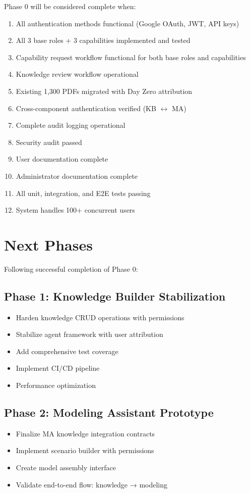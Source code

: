 \documentclass[12pt,a4paper]{article}
\begin{document}
Phase 0 will be considered complete when:

\begin{enumerate}
    \item All authentication methods functional (Google OAuth, JWT, API keys)
    \item All 3 base roles + 3 capabilities implemented and tested
    \item Capability request workflow functional for both base roles and capabilities
    \item Knowledge review workflow operational
    \item Existing 1,300 PDFs migrated with Day Zero attribution
    \item Cross-component authentication verified (KB $\leftrightarrow$ MA)
    \item Complete audit logging operational
    \item Security audit passed
    \item User documentation complete
    \item Administrator documentation complete
    \item All unit, integration, and E2E tests passing
    \item System handles 100+ concurrent users
\end{enumerate}

\section{Next Phases}

Following successful completion of Phase 0:

\subsection{Phase 1: Knowledge Builder Stabilization}
\begin{itemize}
    \item Harden knowledge CRUD operations with permissions
    \item Stabilize agent framework with user attribution
    \item Add comprehensive test coverage
    \item Implement CI/CD pipeline
    \item Performance optimization
\end{itemize}

\subsection{Phase 2: Modeling Assistant Prototype}
\begin{itemize}
    \item Finalize MA knowledge integration contracts
    \item Implement scenario builder with permissions
    \item Create model assembly interface
    \item Validate end-to-end flow: knowledge → modeling
\end{itemize}
\end{document}

